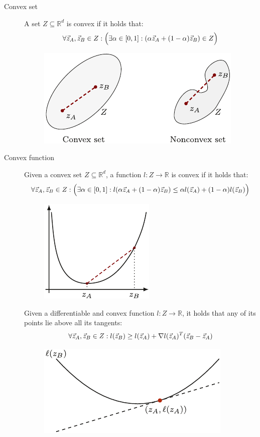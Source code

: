 \begin{description}
    \item[Convex set] 
        A set $Z \subseteq \mathbb{R}^d$ is convex if it holds that:
        \[
            \forall {\vec{z}}_A, {\vec{z}}_B \in Z: \Big( \exists \alpha \in [0, 1]: (\alpha {\vec{z}}_A + (1-\alpha){\vec{z}}_B) \in Z \Big)
        \]

        \begin{figure}[H]
            \centering
            \includegraphics[width=0.4\linewidth]{img/_convex_set.pdf}
        \end{figure}

    \item[Convex function] 
        Given a convex set $Z \subseteq \mathbb{R}^d$, a function $l: Z \rightarrow \mathbb{R}$ is convex if it holds that:
        \[
            \forall {\vec{z}}_A, {\vec{z}}_B \in Z: \Big( \exists \alpha \in [0, 1]: l(\alpha {\vec{z}}_A + (1-\alpha) {\vec{z}}_B) \leq \alpha l({\vec{z}}_A) + (1-\alpha) l({\vec{z}}_B) \Big)
        \]

        \begin{figure}[H]
            \centering
            \includegraphics[width=0.25\linewidth]{img/_convex_function.pdf}
        \end{figure}

        \begin{remark}
            Given a differentiable and convex function $l: Z \rightarrow \mathbb{R}$, it holds that any of its points lie above all its tangents:
            \[ \forall {\vec{z}}_A, {\vec{z}}_B \in Z: l({\vec{z}}_B) \geq l({\vec{z}}_A) + \nabla l({\vec{z}}_A)^T ({\vec{z}}_B - {\vec{z}}_A) \]

            \begin{figure}[H]
                \centering
                \includegraphics[width=0.3\linewidth]{img/_convex_tangent.pdf}
            \end{figure}
        \end{remark}


\end{description}
